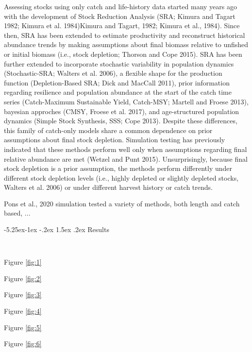 \documentclass[a4paper, 10pt]{article}
\makeatletter
\renewcommand{\section}{\@startsection{section}{1}{\z@}%
  {-5.25ex\@plus -1ex \@minus -.2ex}%
  {1.5ex \@plus .2ex}%
  {\normalfont\bfseries}}
\makeatother
\begin{document}
Assessing stocks using only catch and life-history data started many years ago with the development of Stock Reduction Analysis (SRA; Kimura and Tagart 1982; Kimura et al. 1984)Kimura and Tagart, 1982; Kimura et al., 1984). Since then, SRA has been extended to estimate productivity and reconstruct historical abundance trends by making assumptions about final biomass relative to unfished or initial biomass (i.e., stock depletion; Thorson and Cope 2015). SRA has been further extended to incorporate stochastic variability in population dynamics (Stochastic-SRA; Walters et al. 2006), a flexible shape for the production function (Depletion-Based SRA; Dick and MacCall 2011), prior information regarding resilience and population abundance at the start of the catch time series (Catch-Maximum Sustainable Yield, Catch-MSY; Martell and Froese 2013), bayesian approches (CMSY, Froese et al. 2017), and age-structured population dynamics (Simple Stock Synthesis, SSS; Cope 2013). Despite these differences, this family of catch-only models share a common dependence on prior assumptions about final stock depletion. Simulation testing has previously indicated that these methods perform well only when assumptions regarding final relative abundance are met (Wetzel and Punt 2015). Unsurprisingly, because final stock depletion is a prior assumption, the methods perform differently under different stock depletion levels (i.e., highly depleted or slightly depleted stocks, Walters et al. 2006) or under different harvest history or catch trends.

Pons et al., 2020 simulation tested a variety of methods, both length and catch based, ...


\section{Results}

~

Figure \ref{fig:1}

Figure \ref{fig:2}

Figure \ref{fig:3}

Figure \ref{fig:4}

Figure \ref{fig:5}

Figure \ref{fig:6}


\newpage
 
 
\end{document}
